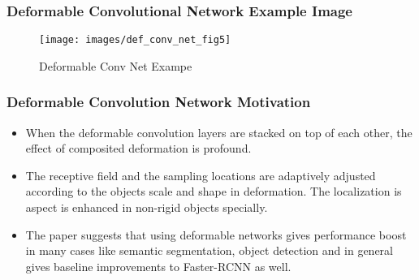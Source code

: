 \documentclass{beamer}
\begin{document}
\begin{frame}
  \frametitle{Deformable Convolutional Network Example Image}
  \begin{figure}[H]
    \centering
    \texttt{[image: images/def\_conv\_net\_fig5]}
    \caption{Deformable Conv Net Exampe}
    \label{fig:dfcnf5}
  \end{figure}
\end{frame}

\begin{frame}
  \frametitle{Deformable Convolution Network Motivation}
  \begin{itemize}
  \item When the deformable convolution layers are stacked on top of each other, the effect of composited deformation is profound.
  \item The receptive field and the sampling locations are adaptively adjusted according to the objects scale and shape in deformation. The localization is aspect is enhanced in non-rigid objects specially.
  \item The paper suggests that using deformable networks gives performance boost in many cases like semantic segmentation, object detection and in general gives baseline improvements to Faster-RCNN as well.
  \end{itemize}
\end{frame}
\end{document}
